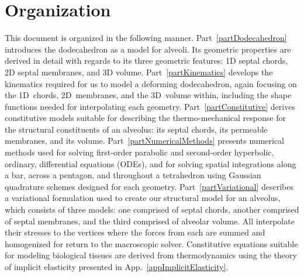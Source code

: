 \section{Organization}

This document is organized in the following manner.  Part~\ref{partDodecahedron} introduces the dodecahedron as a model for alveoli.  Its geometric properties are derived in detail with regards to its three geometric features: 1D septal chords, 2D septal membranes, and 3D volume.  Part~\ref{partKinematics} develops the kinematics required for us to model a deforming dodecahedron, again focusing on the 1D~chords, 2D~membranes, and the 3D~volume within, including the shape functions needed for interpolating each geometry.  Part~\ref{partConstitutive} derives constitutive models suitable for describing the thermo-mechanical response for the structural constituents of an alveolus: its septal chords, its permeable membranes, and its volume.  Part~\ref{partNumericalMethods} presents numerical methods used for solving first-order parabolic and second-order hyperbolic, ordinary, differential equations (ODEs), and for solving spatial integrations along a bar, across a pentagon, and throughout a tetrahedron using Gaussian quadrature schemes designed for each geometry.  Part~\ref{partVariational} describes a variational formulation used to create our structural model for an alveolus, which consists of three models: one comprised of septal chords, another comprised of septal membranes, and the third comprised of alveolar volume.  All interpolate their stresses to the vertices where the forces from each are summed and homogenized for return to the macroscopic solver.  Constitutive equations suitable for modeling biological tissues are derived from thermo\-dynamics using the theory of implicit elasticity presented in App.~\ref{appImplicitElasticity}.
